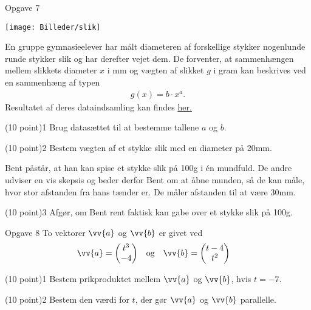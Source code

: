 \begin{opgavetekst}{Opgave 7}
	\begin{center}
		\texttt{[image: Billeder/slik]}
	\end{center}
	En gruppe gymnasieelever har målt diameteren af forskellige stykker nogenlunde runde stykker slik og har derefter vejet dem. De forventer, at sammenhængen mellem slikkets 
	diameter $x$ i mm og vægten af slikket $g$ i gram kan beskrives ved en sammenhæng af typen
	\begin{align*}
		g(x) = b \cdot x^a.
	\end{align*}	 
	Resultatet af deres dataindsamling kan findes \href{https://github.com/ChristianJLex/TeachingNotes/raw/master/2023-2024/Data%20og%20lign/Slikvaegt.xlsx}{\color{blue!60} her.}
\end{opgavetekst}
\begin{delopgave}{(10 point)}{1}
	Brug datasættet til at bestemme tallene $a$ og $b$.
\end{delopgave}
\begin{delopgave}{(10 point)}{2}
	Bestem vægten af et stykke slik med en diameter på 20mm.
\end{delopgave}
\begin{meretekst}
	Bent påstår, at han kan spise et stykke slik på 100g i én mundfuld. De andre udviser en vis skepsis og beder derfor Bent om at åbne munden, så de kan 
	måle, hvor stor afstanden fra hans tænder er. De måler afstanden til at være 30mm. 
\end{meretekst}
\begin{delopgave}{(10 point)}{3}
	Afgør, om Bent rent faktisk kan gabe over et stykke slik på 100g. 
\end{delopgave}

\begin{opgavetekst}{Opgave 8}
	To vektorer $\vv{a}$ og $\vv{b}$ er givet ved
	\begin{align*}
		&\vv{a} = 
		\begin{pmatrix}
			t^3 \\ -4		
		\end{pmatrix}
		& 
		&\textnormal{og}
		&
		&\vv{b} =
		\begin{pmatrix}
			t-4 \\ t^2
		\end{pmatrix}
	\end{align*}
\end{opgavetekst}
\begin{delopgave}{(10 point)}{1}
	Bestem prikproduktet mellem $\vv{a}$ og $\vv{b}$, hvis $t = -7$. 
\end{delopgave}
\begin{delopgave}{(10 point)}{2}
	Bestem den værdi for $t$, der gør $\vv{a}$ og $\vv{b}$ parallelle. 
\end{delopgave}

